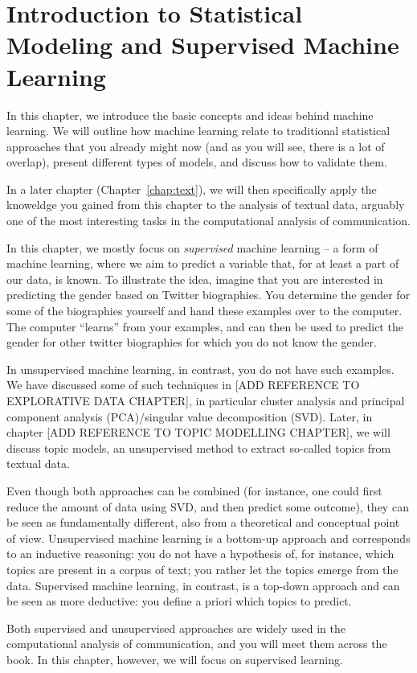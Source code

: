 \chapter{Introduction to Statistical Modeling and Supervised Machine Learning}

In this chapter, we introduce the basic concepts and ideas behind
machine learning.  We will outline how machine learning relate to
traditional statistical approaches that you already might now (and as
you will see, there is a lot of overlap), present different types of
models, and discuss how to validate them.

In a later chapter (Chapter~\ref{chap:text}), we will then
specifically apply the knoweldge you gained from this chapter to the
analysis of textual data, arguably one of the most interesting tasks
in the computational analysis of communication.

In this chapter, we mostly focus on \emph{supervised} machine learning
-- a form of machine learning, where we aim to predict a variable
that, for at least a part of our data, is known. To illustrate the
idea, imagine that you are interested in predicting the gender based
on Twitter biographies. You determine the gender for some of the
biographies yourself and hand these examples over to the computer. The
computer ``learns'' from your examples, and can then be used to
predict the gender for other twitter biographies for which you do not
know the gender.

In unsupervised machine learning, in contrast, you do not have such
examples. We have discussed some of such techniques in [ADD REFERENCE
  TO EXPLORATIVE DATA CHAPTER], in particular cluster analysis and
principal component analysis (PCA)/singular value decomposition (SVD).
Later, in chapter [ADD REFERENCE TO TOPIC MODELLING CHAPTER], we will
discuss topic models, an unsupervised method to extract so-called
topics from textual data.

Even though both approaches can be combined (for instance, one could
first reduce the amount of data using SVD, and then predict some
outcome), they can be seen as fundamentally different, also from a
theoretical and conceptual point of view.  Unsupervised machine
learning is a bottom-up approach and corresponds to an inductive
reasoning: you do not have a hypothesis of, for instance, which topics
are present in a corpus of text; you rather let the topics emerge from
the data.  Supervised machine learning, in contrast, is a top-down
approach and can be seen as more deductive: you define a priori which
topics to predict.

Both supervised and unsupervised approaches are widely used in the computational analysis of communication, and you will meet them across the book.
In this chapter, however, we will focus on supervised learning.








